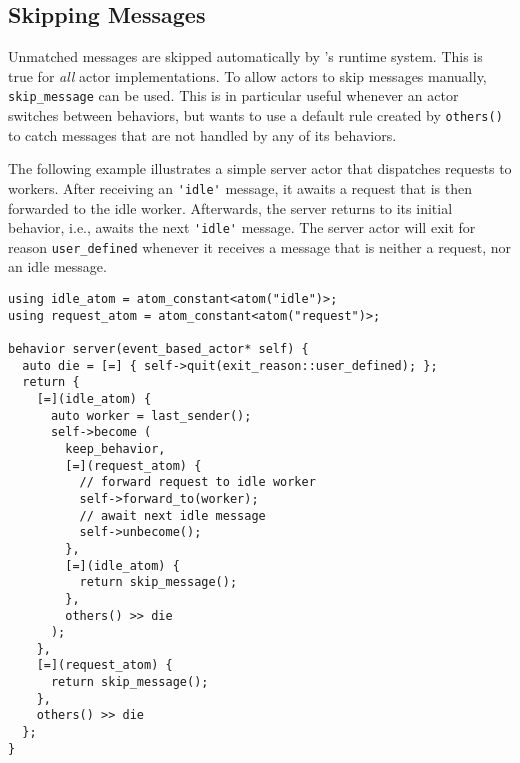 \clearpage
\subsection{Skipping Messages}

Unmatched messages are skipped automatically by \lib's runtime system.
This is true for \textit{all} actor implementations.
To allow actors to skip messages manually, \lstinline^skip_message^ can be used.
This is in particular useful whenever an actor switches between behaviors, but wants to use a default rule created by \lstinline^others()^ to catch messages that are not handled by any of its behaviors.

The following example illustrates a simple server actor that dispatches requests to workers.
After receiving an \lstinline^'idle'^ message, it awaits a request that is then forwarded to the idle worker.
Afterwards, the server returns to its initial behavior, i.e., awaits the next \lstinline^'idle'^ message.
The server actor will exit for reason \lstinline^user_defined^ whenever it receives a message that is neither a request, nor an idle message.

\begin{lstlisting}
using idle_atom = atom_constant<atom("idle")>;
using request_atom = atom_constant<atom("request")>;

behavior server(event_based_actor* self) {
  auto die = [=] { self->quit(exit_reason::user_defined); };
  return {
    [=](idle_atom) {
      auto worker = last_sender();
      self->become (
        keep_behavior,
        [=](request_atom) {
          // forward request to idle worker
          self->forward_to(worker);
          // await next idle message
          self->unbecome();
        },
        [=](idle_atom) {
          return skip_message();
        },
        others() >> die
      );
    },
    [=](request_atom) {
      return skip_message();
    },
    others() >> die
  };
}
\end{lstlisting}
